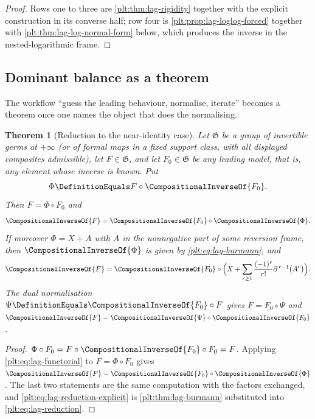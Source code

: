 \documentclass[11pt,oneside]{article}
\theoremstyle{plain}
\newtheorem{theorem}{Theorem}[section]
\theoremstyle{definition}
\theoremstyle{remark}
\newcommand{\compose}{\mathbin{\circ}}
\newcommand{\rev}[1]{\CompositionalInverseOf{#1}}
\begin{document}
\begin{proof}
Rows one to three are \cref{plt:thm:lag-rigidity} together with the explicit
construction in its converse half; row four is
\cref{plt:prop:lag-loglog-forced} together with
\cref{plt:thm:lag-log-normal-form} below, which produces the inverse in the
nested-logarithmic frame.
\end{proof}

\subsection{Dominant balance as a theorem}
\label{plt:sec:lag-reduction}

The workflow ``guess the leading behaviour, normalise, iterate'' becomes a
theorem once one names the object that does the normalising.

\begin{theorem}[Reduction to the near-identity case]
\label{plt:thm:lag-reduction}
Let \(\mathfrak G\) be a group of invertible germs at \(+\infty\) (or of formal
maps in a fixed support class, with all displayed composites admissible), let
\(F\in\mathfrak G\), and let \(F_0\in\mathfrak G\) be any \emph{leading model},
that is, any element whose inverse is known.  Put
\begin{equation}
\label{plt:eq:lag-normalisation}
  \Phi\DefinitionEquals F\compose\rev{F_0}.
\end{equation}
Then \(F=\Phi\compose F_0\) and
\begin{equation}
\label{plt:eq:lag-reduction}
  \rev{F}=\rev{F_0}\compose\rev{\Phi}.
\end{equation}
If moreover \(\Phi=X+A\) with \(A\) in the nonnegative part of some reversion
frame, then \(\rev{\Phi}\) is given by \cref{plt:eq:lag-burmann}, and
\begin{equation}
\label{plt:eq:lag-reduction-explicit}
  \rev{F}
  =\rev{F_0}\compose\Bigl(X+\sum_{r\ge1}\frac{(-1)^r}{r!}
     \partial^{\,r-1}\bigl(A^r\bigr)\Bigr).
\end{equation}
The dual normalisation \(\Psi\DefinitionEquals\rev{F_0}\compose F\) gives
\(F=F_0\compose\Psi\) and \(\rev{F}=\rev{\Psi}\compose\rev{F_0}\).
\end{theorem}

\begin{proof}
\(\Phi\compose F_0=F\compose\rev{F_0}\compose F_0=F\).  Applying
\cref{plt:eq:lag-functorial} to \(F=\Phi\compose F_0\) gives
\(\rev{F}=\rev{F_0}\compose\rev{\Phi}\).  The last two statements are the same
computation with the factors exchanged, and
\cref{plt:eq:lag-reduction-explicit} is \cref{plt:thm:lag-burmann} substituted
into \cref{plt:eq:lag-reduction}.
\end{proof}
\end{document}
